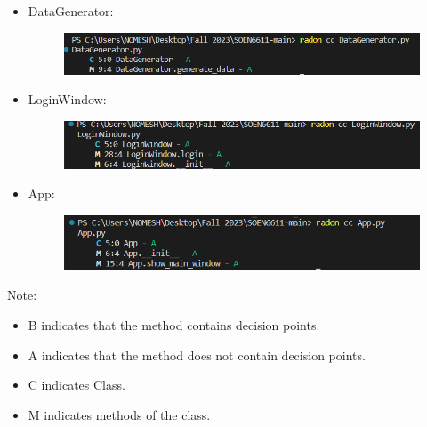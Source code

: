 {{{\begin{itemize}
\begin{figure}[H]
        \linebreak \linebreak \linebreak
    \end{figure}
    \item DataGenerator:
         \begin{figure}[H]
        \centering
        \includegraphics[width=1 \linewidth]{DataGenerator_cc.png} 
    \end{figure}
    \item LoginWindow:
         \begin{figure}[H]
        \centering
        \includegraphics[width=1 \linewidth]{LoginWindow_cc.png} 
    \end{figure}
        \end{itemize}
 
 \begin{itemize}
    \item App:
         \begin{figure}[H]
        \centering
        \includegraphics[width=1 \linewidth]{app_cc.png} 
    \end{figure}
        \end{itemize}

\normalsize{
Note: 
\begin{itemize}[noitemsep]
          \item   B indicates that the method contains decision points.
           \item  A indicates that the method does not contain decision points.
           \item  C indicates Class. 
           \item M indicates methods of the class.
            

\end{itemize}}}}}
